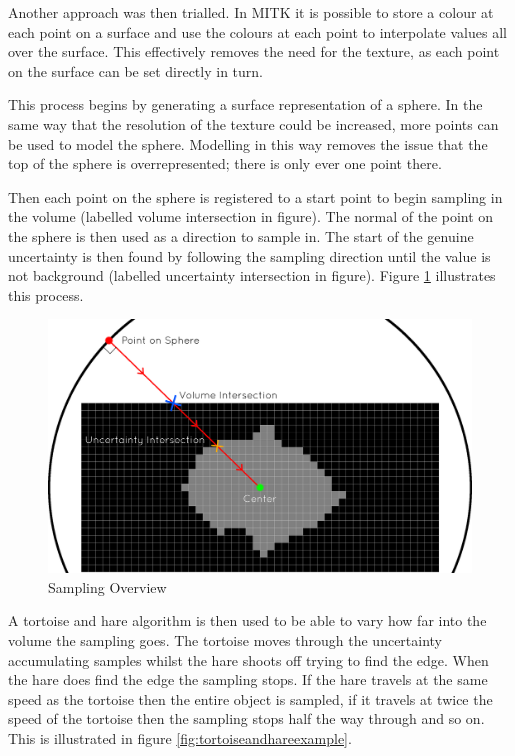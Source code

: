 Another approach was then trialled. In MITK it is possible to store a colour at each point on a surface and use the colours at each point to interpolate values all over the surface. This effectively removes the need for the texture, as each point on the surface can be set directly in turn.

This process begins by generating a surface representation of a sphere. In the same way that the resolution of the texture could be increased, more points can be used to model the sphere. Modelling in this way removes the issue that the top of the sphere is overrepresented; there is only ever one point there.

Then each point on the sphere is registered to a start point to begin sampling in the volume (labelled volume intersection in figure). The normal of the point on the sphere is then used as a direction to sample in. The start of the genuine uncertainty is then found by following the sampling direction until the value is not background (labelled uncertainty intersection in figure). Figure \ref{fig:surface_sampling_example} illustrates this process.

\begin{figure}[H]
  \centering
  \includegraphics[width=\textwidth]{images/surface/sampling_example.png}
  \caption{Sampling Overview}\label{fig:surface_sampling_example}
\end{figure}

A tortoise and hare algorithm is then used to be able to vary how far into the volume the sampling goes. The tortoise moves through the uncertainty accumulating samples whilst the hare shoots off trying to find the edge. When the hare does find the edge the sampling stops. If the hare travels at the same speed as the tortoise then the entire object is sampled, if it travels at twice the speed of the tortoise then the sampling stops half the way through and so on. This is illustrated in figure \ref{fig:tortoiseandhareexample}.

